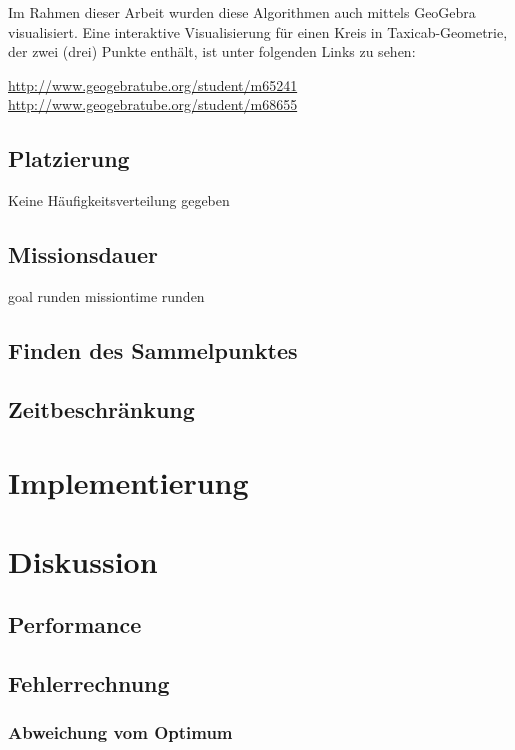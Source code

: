 \documentclass{article}
\begin{document}
Im Rahmen dieser Arbeit wurden diese Algorithmen auch mittels GeoGebra visualisiert. Eine interaktive Visualisierung
für einen Kreis in Taxicab-Geometrie, der zwei (drei) Punkte enthält, ist unter folgenden Links zu sehen: 

\url{http://www.geogebratube.org/student/m65241} \newline
\url{http://www.geogebratube.org/student/m68655}

\subsection{Platzierung}

Keine Häufigkeitsverteilung gegeben

\subsection{Missionsdauer}

goal runden
missiontime runden

\subsection{Finden des Sammelpunktes}

\subsection{Zeitbeschränkung}

\clearpage
\section{Implementierung}


\clearpage
\section{Diskussion}

\subsection{Performance}

\subsection{Fehlerrechnung}

\subsubsection{Abweichung vom Optimum}
\end{document}
